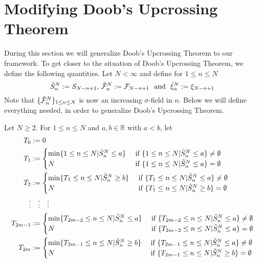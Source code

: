 \section{Modifying Doob's Upcrossing Theorem}
During this section we will generalize Doob's Upcrossing Theorem to our framework. To get closer to the situation of Doob's Upcrossing Theorem, we define the following quantities. Let $N<\infty$ and define for $1\leq n\leq N$ 
\begin{equation*}
\tilde{S}_{n}^N := S_{N-n+1} \textrm{, } \tilde{\mathcal{F}}_{n}^N := \mathcal{F}_{N-n+1} \textrm{ \ and \ } \tilde{\xi}_{n}^N := \xi_{N-n+1}
\end{equation*}
Note that $\{\tilde{\mathcal{F}}_{n}^N\}_{1\leq n\leq N}$ is now an increasing $\sigma$-field in $n$.
%
Below we will define everything needed, in order to generalize Doob's Upcrossing Theorem.
\begin{defn}
	Let $N\geq 2$. For $1\leq n\leq N$ and $a, b \in \mathbb{R}$ with $a < b$, let 
	\begin{align*}
	T_0 &:= 0\\
	T_1 &:= \begin{cases} 
	\min\{1\leq n\leq N | \StN{n}\leq a\} & \textrm{ if } \{1\leq n\leq N | \StN{n}\leq a\}\neq \emptyset\\
	N & \textrm{ if } \{1\leq n\leq N | \StN{n}\leq a\}= \emptyset
	\end{cases}\\	
	T_2 &:= \begin{cases} 
	\min\{T_1\leq n\leq N | \StN{n}\geq b\} & \textrm{ if } \{T_1\leq n\leq N | \StN{n}\leq a\}\neq \emptyset\\
	N & \textrm{ if } \{T_1\leq n\leq N | \StN{n}\geq b\} = \emptyset
	\end{cases}\\	
	\vdots &\quad \vdots \quad \vdots	\\
	T_{2m-1} &:= \begin{cases} 
	\min\{T_{2m-2}\leq n\leq N | \StN{n}\leq a\} & \textrm{ if } \{T_{2m-2}\leq n\leq N | \StN{n}\leq a\}\neq \emptyset\\
	N & \textrm{ if } \{T_{2m-2}\leq n\leq N | \StN{n}\leq a\}= \emptyset
	\end{cases}\\	
	T_{2m} &:= \begin{cases} 
	\min\{T_{2m-1}\leq n\leq N | \StN{n}\geq b\} & \textrm{ if } \{T_{2m-1}\leq n\leq N | \StN{n}\leq a\}\neq \emptyset\\
	N & \textrm{ if } \{T_{2m-1}\leq n\leq N | \StN{n}\geq b\} = \emptyset
	\end{cases}\\

\end{align*}
\end{defn}
